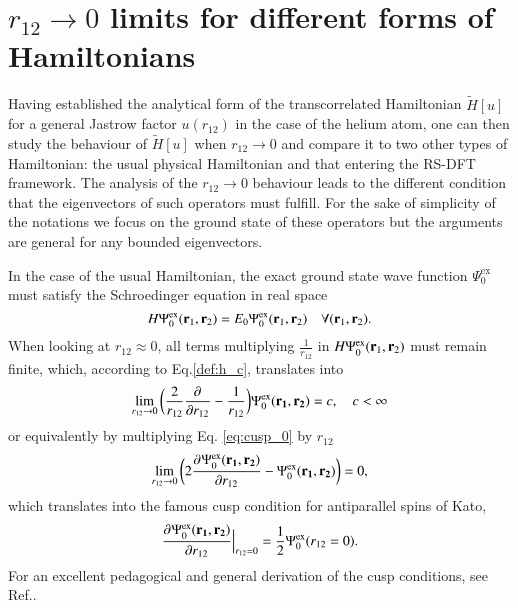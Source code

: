 \documentclass[aip,jcp,reprint,noshowkeys,superscriptaddress]{revtex4-1}
\newcommand{\deriv}[3]{\frac{\partial^{#3} #1}{\partial {#2}^{#3}}}
\newcommand{\bd}[1]{{\bf {#1}}}
\newcommand{\br}[0]{{\bf {r}}}
\newcommand{\psiex}[0]{\Psi^{\text{ex}}_0}
\begin{document}
\section{$r_{12} \rightarrow 0$ limits for different forms of Hamiltonians}
\label{sec:cusp}
Having established the analytical form of the transcorrelated Hamiltonian $\tilde{H}[u]$ for a general Jastrow factor $u(r_{12})$ in the case of the helium atom, one can then study the behaviour of $\tilde{H}[u]$ when $r_{12}\rightarrow 0$ and compare it to two other types of Hamiltonian: the usual physical Hamiltonian and that entering the RS-DFT framework. 
The analysis of the $r_{12}\rightarrow 0$ behaviour leads to the different condition that the eigenvectors of such operators must fulfill. For the sake of simplicity of the notations we focus on the ground state of these operators but the arguments are general for any bounded eigenvectors. 

In the case of the usual Hamiltonian, the exact ground state wave function $\psiex$ must satisfy the Schroedinger equation in real space 
\begin{equation}
 H \psiex(\br{}_1,\br{}_2) = E_0 \psiex(\br{}_1,\br{}_2)\quad \forall (\br{}_1,\br{}_2).
\end{equation}
When looking at $r_{12}\approx 0$, all terms multiplying $\frac{1}{r_{12}}$ in $H \psiex(\br{}_1,\br{}_2)$ must remain finite, which, according to Eq.\eqref{def:h_c}, translates into
\begin{equation}
 \label{eq:cusp_0}
 \lim_{r_{12}\rightarrow 0}\bigg( \frac{2}{r_{12}} \deriv{}{r_{12}}{} -\frac{1}{r_{12}}\bigg) \psiex(\bd{r_1},\bd{r_2})  = c,\quad c<\infty 
\end{equation}
or equivalently by multiplying Eq. \eqref{eq:cusp_0} by $r_{12}$
\begin{equation}
 \lim_{r_{12}\rightarrow 0}\bigg( 2 \deriv{\psiex(\bd{r_1},\bd{r_2})}{r_{12}}{} -\psiex(\bd{r_1},\bd{r_2}) \bigg) = 0, 
\end{equation}
which translates into the famous cusp condition for antiparallel spins of Kato\cite{Kat-CPAM-57}, 
\begin{equation}
 \deriv{\psiex(\bd{r_1},\bd{r_2})}{r_{12}}{}\Bigr|_{r_{12}=0} = \frac{1}{2} \psiex(r_{12}=0). 
\end{equation} 
For an excellent pedagogical and general derivation of the cusp conditions, see Ref.. 
\end{document}
